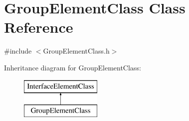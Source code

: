 \hypertarget{class_group_element_class}{}\section{Group\+Element\+Class Class Reference}
\label{class_group_element_class}


{\ttfamily \#include $<$Group\+Element\+Class.\+h$>$}

Inheritance diagram for Group\+Element\+Class\+:\begin{figure}[H]
\begin{center}
\leavevmode
\includegraphics[height=2.000000cm]{class_group_element_class}
\end{center}
\end{figure}
